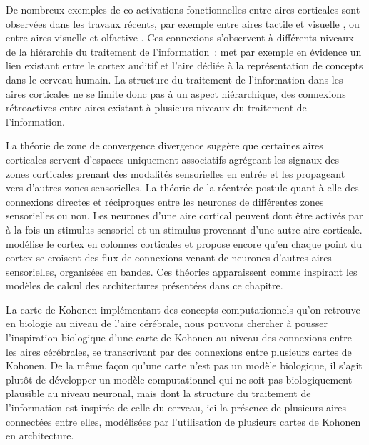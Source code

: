 \documentclass[../main]{subfiles}
\begin{document}
De nombreux exemples de co-activations fonctionnelles entre aires corticales sont observées dans les travaux récents, par exemple entre aires tactile et visuelle \cite{Sathian2002FeelingWT}, ou entre aires visuelle et olfactive \cite{Gonzlez2006ReadingCA}.
Ces connexions s'observent à différents niveaux de la hiérarchie du traitement de l'information~: \cite{Kiefer2008TheSO} met par exemple en évidence un lien existant entre le cortex auditif et l'aire dédiée à la représentation de concepts dans le cerveau humain.
La structure du traitement de l'information dans les aires corticales ne se limite donc pas à un aspect hiérarchique, des connexions rétroactives entre aires existant à plusieurs niveaux du traitement de l'information.


La théorie de zone de convergence divergence \cite{damasio_time-locked_1989} suggère que certaines aires corticales servent d'espaces uniquement associatifs agrégeant les signaux des zones corticales prenant des modalités sensorielles en entrée et les propageant vers d'autres zones sensorielles. 
La théorie de la réentrée \cite{Edelman1982GroupSA} postule quant à elle des connexions directes et réciproques entre les neurones de différentes zones sensorielles ou non. Les neurones d'une aire cortical peuvent dont être activés par à la fois un stimulus sensoriel et un stimulus provenant d'une autre aire corticale.
\cite{Burnod1989AnAN} modélise le cortex en colonnes corticales et propose encore qu'en chaque point du cortex se croisent des flux de connexions venant de neurones d'autres aires sensorielles, organisées en bandes. Ces théories apparaissent comme inspirant les modèles de calcul des architectures présentées dans ce chapitre.

La carte de Kohonen implémentant des concepts computationnels qu'on retrouve en biologie au niveau de l'aire cérébrale, nous pouvons chercher à pousser l'inspiration biologique d'une carte de Kohonen au niveau des connexions entre les aires cérébrales, se transcrivant par des connexions entre plusieurs cartes de Kohonen.
De la même façon qu'une carte n'est pas un modèle biologique, il s'agit plutôt de développer un modèle computationnel qui ne soit pas biologiquement plausible au niveau neuronal, mais dont la structure du traitement de l'information est inspirée de celle du cerveau, ici la présence de plusieurs aires connectées entre elles, modélisées par l'utilisation de plusieurs cartes de Kohonen en architecture.

\end{document}
